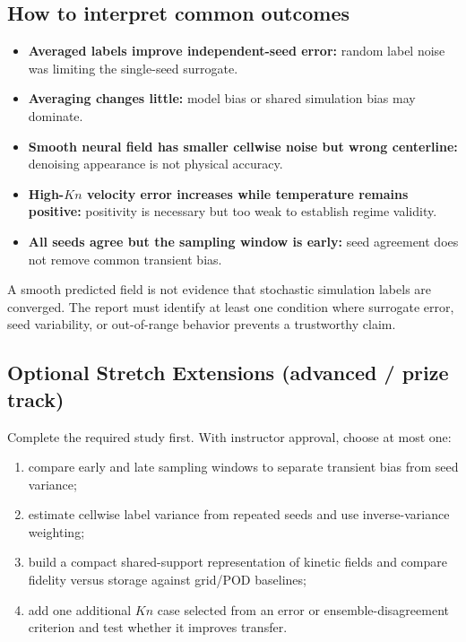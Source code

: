 \documentclass[11pt]{article}
\begin{document}
\subsection{How to interpret common outcomes}
\begin{itemize}
\item \textbf{Averaged labels improve independent-seed error:} random label noise was limiting the single-seed surrogate.
\item \textbf{Averaging changes little:} model bias or shared simulation bias may dominate.
\item \textbf{Smooth neural field has smaller cellwise noise but wrong centerline:} denoising appearance is not physical accuracy.
\item \textbf{High-$Kn$ velocity error increases while temperature remains positive:} positivity is necessary but too weak to establish regime validity.
\item \textbf{All seeds agree but the sampling window is early:} seed agreement does not remove common transient bias.
\end{itemize}

\begin{failurebox}
A smooth predicted field is not evidence that stochastic simulation labels are converged. The report must identify at least one condition where surrogate error, seed variability, or out-of-range behavior prevents a trustworthy claim.
\end{failurebox}

\subsection{Optional Stretch Extensions (advanced / prize track)}
Complete the required study first. With instructor approval, choose at most one:
\begin{enumerate}
\item compare early and late sampling windows to separate transient bias from seed variance;
\item estimate cellwise label variance from repeated seeds and use inverse-variance weighting;
\item build a compact shared-support representation of kinetic fields and compare fidelity versus storage against grid/POD baselines;
\item add one additional $Kn$ case selected from an error or ensemble-disagreement criterion and test whether it improves transfer.
\end{enumerate}
\end{document}
